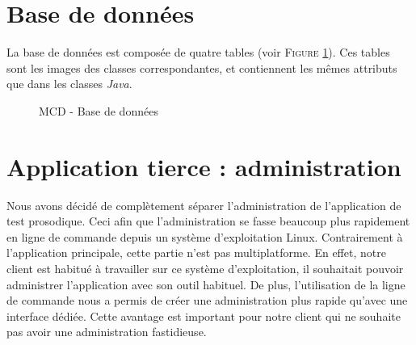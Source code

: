 \section{Base de données}

La base de données est composée de quatre tables (voir \textsc{Figure} \ref{MCD}). Ces tables sont les images des classes correspondantes, et contiennent les mêmes attributs que dans les classes \textit{Java}.

\begin{figure}[!h]
\begin{center}
  \caption{MCD - Base de données}
  \label{MCD} 
\end{center}
\end{figure}


\section{Application tierce : administration}

Nous avons décidé de complètement séparer l'administration de l'application de test prosodique. Ceci afin que l'administration se fasse beaucoup plus rapidement en ligne de commande depuis un système d'exploitation Linux. Contrairement à l'application principale, cette partie n'est pas multiplatforme. En effet, notre client est habitué à travailler sur ce système d'exploitation, il souhaitait pouvoir administrer l'application avec son outil habituel. De plus, l'utilisation de la ligne de commande nous a permis de créer une administration plus rapide qu'avec une interface dédiée. Cette avantage est important pour notre client qui ne souhaite pas avoir une administration fastidieuse.\\

